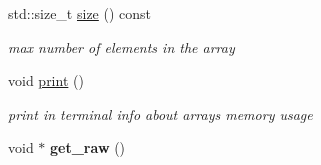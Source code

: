 \begin{DoxyCompactItemize}
std\+::size\+\_\+t \hyperlink{classshared__memory_1_1array_ad6019f83449e4ea8d1bf4bd0d48c29b0}{size} () const
\begin{DoxyCompactList}\small\item\em max number of elements in the array \end{DoxyCompactList}\item 
\mbox{\label{classshared__memory_1_1array_a9e912e143886359921c04fdbba7f6cba}} 
void \hyperlink{classshared__memory_1_1array_a9e912e143886359921c04fdbba7f6cba}{print} ()
\begin{DoxyCompactList}\small\item\em print in terminal info about array\textquotesingle{}s memory usage \end{DoxyCompactList}\item 
\mbox{\label{classshared__memory_1_1array_a20e27fb6b9a18e252368c4f6118b3d27}} 
void $\ast$ {\bfseries get\+\_\+raw} ()
\end{DoxyCompactItemize}
